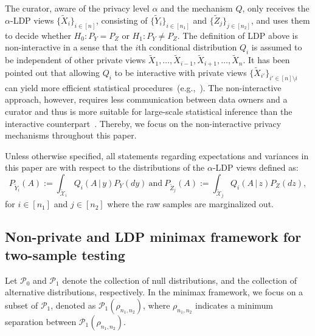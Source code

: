 \documentclass[twoside,11pt]{article}
\newcommand{\distClassGeneric}{\mathcal{P}}
\newcommand{\minSep}{\rho} %
\newcommand{\rvX}{X} %
\newcommand{\rvXCodomain}{\mathcal{\rvX}} %
\newcommand{\rvXPrivCodomain}{\tilde{\rvXCodomain}}
\newcommand{\rvY}{Y}
\newcommand{\rvYPriv}{\tilde{\rvY}} %
\newcommand{\rvZ}{Z}
\newcommand{\rvZPriv}{\tilde{\rvZ}} %
\newcommand{\sampleIndexOne}{i}
\newcommand{\sampleIndexTwo}{j}
\newcommand{\sampleSets}[3]{\{{#1}_{#2}\}_{#2 \in [#3]}}
\newcommand{\sampleSize}{n}
\newcommand{\privacyParameter}{\alpha} %
\begin{document}
\noindent
The curator, aware of the privacy level $\alpha$ and the  mechanism $Q$, only receives the $\privacyParameter$-LDP views $\{\tilde{X}_i\}_{i \in [n]}$, consisting of $\sampleSets{\rvYPriv}{\sampleIndexOne}{\sampleSize_1}$ and $\sampleSets{\rvZPriv}{\sampleIndexTwo}{\sampleSize_2}$, and uses them to decide whether $H_0: P_\rvY = P_\rvZ$  or $H_1: P_\rvY \neq P_\rvZ$.
The definition of LDP above is non-interactive in a sense that the $\sampleIndexOne$th conditional distribution $Q_\sampleIndexOne$ is assumed to be independent of other private views $\tilde{X}_1,\ldots,\tilde{X}_{i-1},\tilde{X}_{i+1},\ldots,\tilde{X}_n$.
It has been pointed out that allowing $Q_i$ to be interactive with private views $\{ \tilde{X}_{i'} \}_{i' \in [\sampleSize]\setminus{i}}$ can yield more efficient statistical procedures~(e.g.,~\cite{Acharya2022InteractiveConstraints,Berrett2020Interactive, Kasiviswanathan2008WhatPrivately}).
The non-interactive approach, however, requires less communication between data owners and a curator and thus is more suitable for large-scale statistical inference than the interactive counterpart~\citep{Berret2021Classification, Joseph2019Interactivity}. Thereby, we focus on the non-interactive privacy mechanisms throughout this paper.

Unless otherwise specified, all statements regarding expectations and variances in this paper are with respect to the distributions of the $\privacyParameter$-LDP views defined as:
\begin{equation*}
	P_{ \tilde{Y}_{i}}(A) := \int_{\rvXPrivCodomain_i}
	Q_\sampleIndexOne
	(
	A\,|\,
	y
	)
	P_Y(dy)~\text{and}~
	P_{ \tilde{Z}_{j}}(A) := \int_{\rvXPrivCodomain_j}
	Q_\sampleIndexOne
	(
	A\,|\,
	z
	)
	P_Z(dz),
\end{equation*}
for $i \in [n_1]$ and $j \in [n_2]$ where the raw samples are marginalized out.

\subsection{Non-private and LDP minimax framework for two-sample testing}\label{subsection:testing}

Let $\distClassGeneric_0$ and $\distClassGeneric_1$ denote the collection of null distributions, and the collection of alternative distributions, respectively. In the minimax framework, we focus on a subset of $\distClassGeneric_1$, denoted as $\distClassGeneric_1(\minSep_{\sampleSize_1, \sampleSize_2})$, where $\minSep_{\sampleSize_1, \sampleSize_2}$ indicates a minimum separation between $\distClassGeneric_1(\minSep_{\sampleSize_1, \sampleSize_2})$. 
\end{document}
